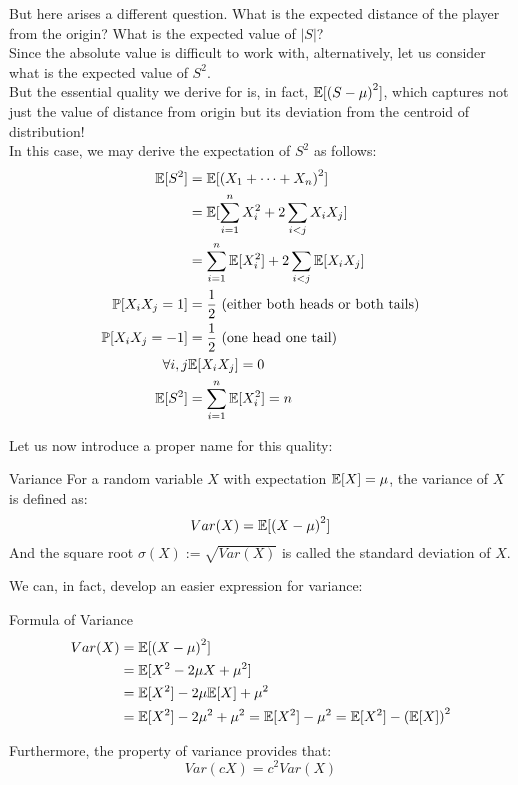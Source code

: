 But here arises a different question. What is the expected distance of the player from the origin? What is the expected value of $|S|$? \\
Since the absolute value is difficult to work with, alternatively, let us consider what is the expected value of $S^2$. \\
But the essential quality we derive for is, in fact, $\mathbb{E}[{(S - \mu)}^2]$, which captures not just the value of distance from origin but its deviation from the centroid of distribution! \\
In this case, we may derive the expectation of $S^2$ as follows:
\begin{align*}
    \mathbb{E}[S^2] &= \mathbb{E}[{(X_1 + \cdots + X_n)}^2] \\
    &= \mathbb{E}[\sum_{i = 1}^n X_i^2 + 2 \sum_{i < j} X_i X_j] \\
    &= \sum_{i = 1}^n \mathbb{E}[X_i^2] + 2 \sum_{i < j} \mathbb{E}[X_i X_j] \\
    \mathbb{P}[X_i X_j = 1] &= \frac{1}{2} \text{ (either both heads or both tails)} \\
    \mathbb{P}[X_i X_j = -1] &= \frac{1}{2} \text{ (one head one tail)} \\
    \forall i, j &\mathbb{E}[X_i X_j] = 0 \\
    \mathbb{E}[S^2] &= \sum_{i = 1}^n \mathbb{E}[X_i^2] = n
\end{align*}

Let us now introduce a proper name for this quality:
\begin{ln-define}{Variance}{}
    For a random variable $X$ with expectation $\mathbb{E}[X] = \mu$, the variance of $X$ is defined as:
    \[Var(X) = \mathbb{E}[{(X - \mu)}^2]\]
    And the square root $\sigma(X) := \sqrt{Var(X)}$ is called the standard deviation of $X$.
\end{ln-define}

We can, in fact, develop an easier expression for variance:
\begin{ln-theorem}{Formula of Variance}{}
    \begin{align*}
        Var(X) &= \mathbb{E}[{(X - \mu)}^2] \\
        &= \mathbb{E}[X^2 - 2\mu X + \mu^2] \\
        &= \mathbb{E}[X^2] - 2\mu \mathbb{E}[X] + \mu^2 \\
        &= \mathbb{E}[X^2]- 2\mu^2 + \mu^2 = \mathbb{E}[X^2]- \mu^2 = \mathbb{E}[X^2] - {(\mathbb{E}[X])}^2
    \end{align*}
\end{ln-theorem}

Furthermore, the property of variance provides that:
\[Var(cX) = c^2 Var(X)\]

